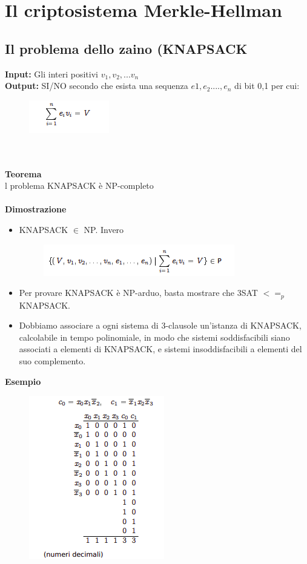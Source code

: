 \chapter{Il criptosistema Merkle-Hellman} \label{ch:capitolo14}
\section{Il problema dello zaino (KNAPSACK}
\textbf{Input:} Gli interi positivi $v_1,v_2,...v_n$\\
\textbf{Output:} SI/NO secondo che esista una sequenza $e1,e_2....,e_n$ di bit 0,1
per cui:
\begin{figure}[htp]
    \centering
    \includegraphics[scale=0.9]{tesi_stile/img/foto1cap14.png}
\end{figure}
\\\\\textbf{Teorema}\\
l problema KNAPSACK è NP-completo\\\\
\textbf{Dimostrazione}\\
\begin{itemize}
    \item KNAPSACK $\in$ NP. Invero
    
    \begin{figure}[htp]
        \centering
        \includegraphics[scale=0.9]{tesi_stile/img/foto2cap14.png}
    \end{figure}
    
    \item Per provare KNAPSACK è NP-arduo, basta mostrare che 3SAT $<=_p$ KNAPSACK.
    
    \item Dobbiamo associare a ogni sistema di 3-clausole un’istanza di KNAPSACK, calcolabile in tempo polinomiale, in modo che sistemi soddisfacibili siano associati a elementi di KNAPSACK, e sistemi insoddisfacibili a elementi del suo complemento.
\end{itemize}
\textbf{Esempio}
 \begin{figure}[htp]
    \centering
    \includegraphics[scale=0.9]{tesi_stile/img/foto3cap14.png}
\end{figure}
